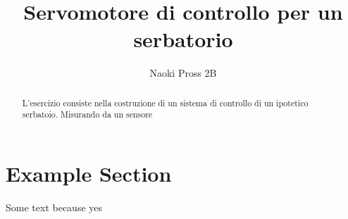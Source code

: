 \documentclass[a4paper]{article}        %
\begin{document}
	\author{Naoki Pross 2B}
    \title{Servomotore di controllo per un serbatorio} 
	\maketitle

    \begin{abstract}
        L'esercizio consiste nella costruzione di un sistema di controllo di un
        ipotetico serbatoio. Misurando da un sensore 
    \end{abstract}
	
	\section{Example Section}
        Some text because yes
    
\end{document}
